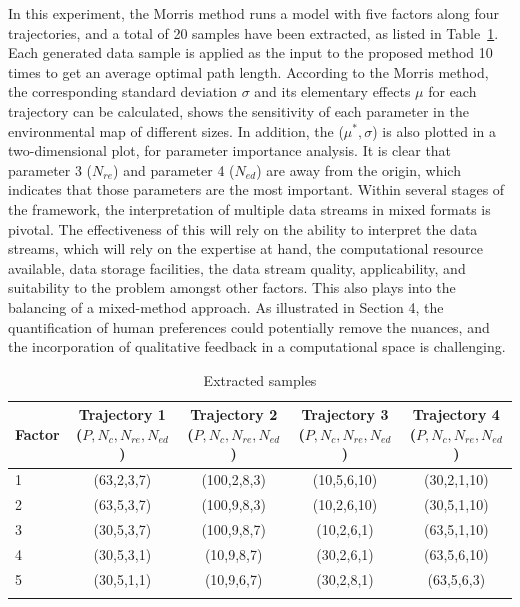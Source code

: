 \documentclass{PDS}%
\theoremstyle{definition}
\begin{document}
 In this experiment, the
Morris method runs a model with five factors along four trajectories, and a total of 20 samples have
been extracted, as listed in Table~\ref{table:samples}. Each generated data sample is
applied as the input to the proposed method 10 times to get an average optimal path
length. According to the Morris method, the
corresponding standard deviation $\sigma$ and its elementary effects $\mu$ for each
trajectory can be calculated, shows the sensitivity of each parameter in the environmental map of different sizes. In
addition, the ($\mu^*,\sigma$) is also plotted in a two-dimensional plot, for parameter importance analysis. It is clear that parameter 3
($N_{re}$) and parameter 4 ($N_{ed}$) are away from the origin, which indicates that
those parameters are the most important.
Within several stages of the framework, the interpretation of
multiple data streams in mixed formats is pivotal. The effectiveness of this will rely on the ability to
interpret the data streams, which will rely on the expertise at hand, the computational resource available,
data storage facilities, the data stream quality, applicability, and suitability to the problem amongst other
factors. This also plays into the balancing of a mixed-method approach. As illustrated in Section 4, the
quantification of human preferences could potentially remove the nuances, and the incorporation of
qualitative feedback in a computational space is challenging.

\begin{table}[h]
\centering
\caption{Extracted samples\label{table:samples}}
\begin{tabular}{@{\extracolsep\fill}lcccc@{\extracolsep\fill}}
\toprule
Factor & \multicolumn{1}{p{6pc}}{\centering Trajectory 1 ($P,N_c,N_{re},N_{ed}$)}
& \multicolumn{1}{p{6pc}}{\centering Trajectory 2 ($P,N_c,N_{re},N_{ed}$)}
& \multicolumn{1}{p{6pc}}{\centering Trajectory 3 ($P,N_c,N_{re},N_{ed}$)}
& \multicolumn{1}{p{6pc}}{\centering Trajectory 4 ($P,N_c,N_{re},N_{ed}$)} \\
\midrule
 1 & (63,2,3,7) & (100,2,8,3) & (10,5,6,10) & (30,2,1,10) \\
 2 & (63,5,3,7) & (100,9,8,3) & (10,2,6,10) & (30,5,1,10) \\
 3 & (30,5,3,7) & (100,9,8,7) & (10,2,6,1) & (63,5,1,10) \\
 4 & (30,5,3,1) & (10,9,8,7) & (30,2,6,1) & (63,5,6,10) \\
 5 & (30,5,1,1) & (10,9,6,7) & (30,2,8,1) & (63,5,6,3) \\
\botrule
\end{tabular}
\end{table}
\end{document}
